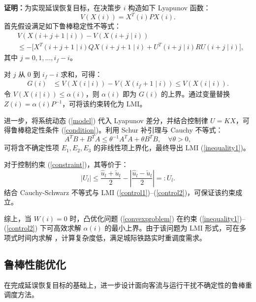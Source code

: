 \textbf{证明：}为实现延误恢复目标，在决策步 $i$ 构造如下 Lyapunov 函数：
\begin{equation}
V(X(i)) = X^{\!T}(i) P X(i).
\end{equation}
首先假设满足如下鲁棒稳定性不等式：
\begin{equation}
\label{suppose}
\begin{aligned}
& V(X(i+j+1 \mid i)) - V(X(i+j \mid i)) \\
& \leq -\big[ X^{\!T}(i+j+1 \mid i) Q X(i+j+1 \mid i) + U^{\!T}(i+j \mid i) R U(i+j \mid i) \big],
\end{aligned}
\end{equation}
其中 $j = 0,1,\dots,i_f - i$。

对 $j$ 从 0 到 $i_f - i$ 求和，可得：
\begin{equation}
\begin{aligned}
G(i) &\leq V(X(i \mid i)) - V(X(i_f+1 \mid i)) \leq V(X(i \mid i)).
\end{aligned}
\end{equation}
令 $V(X(i \mid i)) \leq \alpha(i)$，则 $\alpha(i)$ 即为 $G(i)$ 的上界。通过变量替换 $Z(i) = \alpha(i) P^{-1}$，可将该约束转化为 LMI。

进一步，将系统动态 (\ref{model}) 代入 Lyapunov 差分，并结合控制律 $U = KX$，可得鲁棒稳定性条件 (\ref{condition})。利用 Schur 补引理与 Cauchy 不等式：
\[
A^{\!T}B + B^{\!T}A \leq \theta^{-1} A^{\!T}A + \theta B^{\!T}B, \quad \forall \theta > 0,
\]
可将含不确定性项 $E_1, E_2, E_3$ 的非线性项上界化，最终导出 LMI (\ref{inequality1})。

对于控制约束 (\ref{constraint})，其等价于：
\[
|U_l| \leq \frac{\hat{u}_l + \check{u}_l}{2} - \left| \frac{\hat{u}_l - \check{u}_l}{2} \right| =: U_l.
\]
结合 Cauchy-Schwarz 不等式与 LMI (\ref{control1})–(\ref{control2})，可保证该约束成立。

综上，当 $W(i) = 0$ 时，凸优化问题 (\ref{convexproblem}) 在约束 (\ref{inequality1})–(\ref{control2}) 下可高效求解 $\alpha(i)$ 的最小上界。由于该问题为 LMI 形式，可在多项式时间内求解 \citep{b45}，计算复杂度低，满足城际铁路实时重调度需求。

\subsection{鲁棒性能优化}
在完成延误恢复目标的基础上，进一步设计面向客流与运行干扰不确定性的鲁棒重调度方法。

